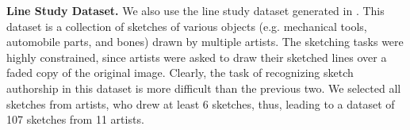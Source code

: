 





\noindent\textbf{Line Study Dataset.} We also use the line study dataset generated in \cite{Cole:2008:PDL:1360612.1360687}. This dataset is a collection of sketches of various objects (e.g. mechanical tools, automobile parts, and bones) drawn by multiple artists. The sketching tasks were highly constrained, since artists were asked to draw their sketched lines over a faded copy of the original image. Clearly, the task of recognizing sketch authorship in this dataset is more difficult than the previous two. We selected all sketches from artists, who drew at least 6 sketches, thus, leading to a dataset of 107 sketches from 11 artists.  %

